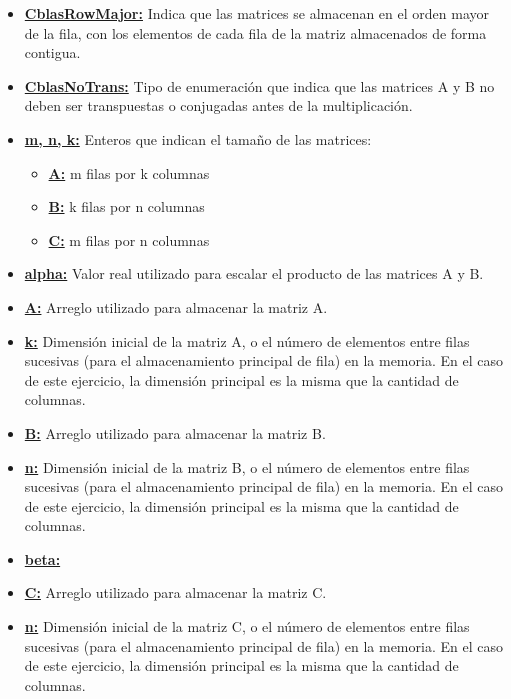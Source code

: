     \begin{itemize}
        \item \underline{\textbf{CblasRowMajor:}} Indica que las matrices se
        almacenan en el orden mayor de la fila, con los elementos de cada fila
        de la matriz almacenados de forma contigua.
        \item \underline{\textbf{CblasNoTrans:}} Tipo de enumeración que indica
        que las matrices A y B no deben ser transpuestas o conjugadas antes de
        la multiplicación.
        \item \underline{\textbf{m, n, k:}} Enteros que indican el tamaño de
        las matrices:
        \begin{itemize}
            \item \underline{\textbf{A:}} m filas por k columnas
            \item \underline{\textbf{B:}} k filas por n columnas
            \item \underline{\textbf{C:}} m filas por n columnas
        \end{itemize}
        \item \underline{\textbf{alpha:}} Valor real utilizado para escalar el
        producto de las matrices A y B.
        \item \underline{\textbf{A:}} Arreglo utilizado para almacenar la matriz A.
        \item \underline{\textbf{k:}} Dimensión inicial de la matriz A, o el
        número de elementos entre filas sucesivas (para el almacenamiento
        principal de fila) en la memoria. En el caso de este ejercicio,
        la dimensión principal es la misma que la cantidad de columnas.
        \item \underline{\textbf{B:}} Arreglo utilizado para almacenar la matriz B.
        \item \underline{\textbf{n:}} Dimensión inicial de la matriz B, o el
        número de elementos entre filas sucesivas (para el almacenamiento
        principal de fila) en la memoria. En el caso de este ejercicio, la
        dimensión principal es la misma que la cantidad de columnas.
        \item \underline{\textbf{beta:}}
        \item \underline{\textbf{C:}} Arreglo utilizado para almacenar la matriz C.
        \item \underline{\textbf{n:}} Dimensión inicial de la matriz C, o el
        número de elementos entre filas sucesivas (para el almacenamiento
        principal de fila) en la memoria. En el caso de este ejercicio, la
        dimensión principal es la misma que la cantidad de columnas.
    \end{itemize}


